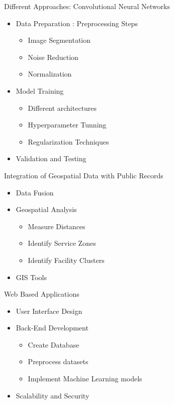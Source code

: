\documentclass{beamer}
\begin{document}
\begin{frame}{Different Approaches: Convolutional Neural Networks}
    \begin{itemize}
        \item{Data Preparation : Preprocessing Steps}
        \begin{itemize}
        \item{Image Segmentation}
        \item{Noise Reduction}
        \item{Normalization}
        \end{itemize}
        \item{Model Training }
        \begin{itemize}
        \item{Different architectures}
        \item{Hyperparameter Tunning}
        \item{Regularization Techniques}
        \end{itemize}
        \item{Validation and Testing}
    \end{itemize}
\end{frame}

\begin{frame}{Integration of Geospatial Data with Public Records}
    \begin{itemize}
        \item{Data Fusion}
        \item{Geospatial Analysis }
        \begin{itemize}
        \item{Measure Distances}
        \item{Identify Service Zones}
        \item{Identify Facility Clusters }
        \end{itemize}
        \item{GIS Tools}
    \end{itemize}
\end{frame}

\begin{frame}{Web Based Applications}
    \begin{itemize}
        \item{User Interface Design}
        \item{Back-End Development}
        \begin{itemize}
        \item{Create Database}
        \item{Preprocess datasets}
        \item{Implement Machine Learning models}
        \end{itemize}
        \item{Scalability and Security}
    \end{itemize}
\end{frame}
\end{document}
